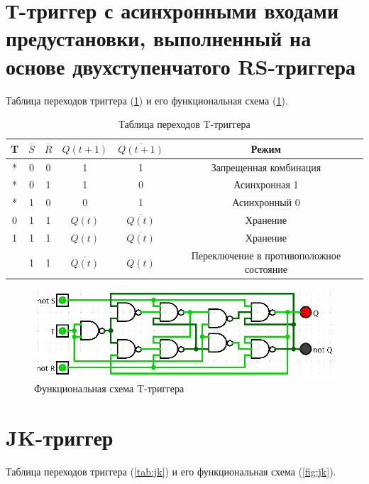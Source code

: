 \documentclass[14pt, a4paper]{extreport}
\newcommand\clockbt{%
	\begin{tikzpicture}[scale=0.25pt]
		\draw (0,0) -- (1,0) -- (1,1) -- (2,1);
	\end{tikzpicture}%
}
\begin{document}
\section{Т-триггер с асинхронными входами предустановки, выполненный на основе двухступенчатого RS-триггера}
Таблица переходов триггера (\cref{tab:t-on-dual-rs}) и его функциональная схема (\cref{fig:t-on-dual-rs}).

\begin{table}[H]
	\caption{Таблица переходов T-триггера}
	\label{tab:t-on-dual-rs}
	\begin{tabular}{|c|c|c|c|c|c|}
		\hline
		T & $\overline{S}$ & $\overline{R}$ & $Q(t + 1)$ & $\overline{Q(t + 1)}$ & Режим \\
		\hline
		* & 0 & 0 & 1 & 1 & Запрещенная комбинация \\
		\hline
		* & 0 & 1 & 1 & 0 & Асинхронная 1 \\
		\hline
		* & 1 & 0 & 0 & 1 & Асинхронный 0 \\
		\hline
		0 & 1 & 1 & $Q(t)$ & $\overline{Q(t)}$ & Хранение \\
		\hline
		1 & 1 & 1 & $Q(t)$ & $\overline{Q(t)}$ & Хранение \\
		\hline
		\clockbt & 1 & 1 & $\overline{Q(t)}$ & $Q(t)$ & Переключение в противоположное состояние \\
		\hline
	\end{tabular}
\end{table}

\begin{figure}[H]
	\caption{Функциональная схема T-триггера}
	\label{fig:t-on-dual-rs}
	\includegraphics[width=\textwidth]{t-on-dual-rs}
\end{figure}

\section{JK-триггер}
Таблица переходов триггера (\cref{tab:jk}) и его функциональная схема (\cref{fig:jk}).
\end{document}
